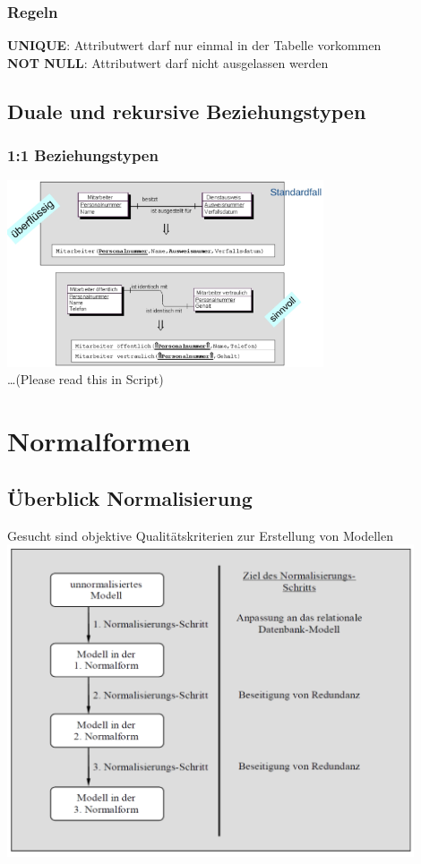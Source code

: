 \documentclass{scrreprt}
\begin{document}
\subsection{Regeln}
\textbf{UNIQUE}: Attributwert darf nur einmal in der Tabelle vorkommen
\\\textbf{NOT NULL}: Attributwert darf nicht ausgelassen werden
\section{Duale und rekursive Beziehungstypen}
\subsection{1:1 Beziehungstypen}
\includegraphics[width=0.7\textwidth]{"graphics/1zu1"}
\\\dots (Please read this in Script)
\chapter{Normalformen}
\section{Überblick Normalisierung}
Gesucht sind objektive Qualitätskriterien zur Erstellung von Modellen
\\\includegraphics[width=0.9\textwidth]{"graphics/Normalisierung"}
\end{document}
